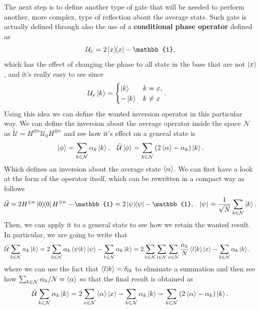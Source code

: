 \noindent
The next step is to define another type of gate that will be needed to perform another, more complex, type of reflection about the average state. Such gate is actually defined through also the use of a \textbf{conditional phase operator} defined as
\begin{equation}
    \mathcal{U}_x = 2\ketbra{x} - \mathbb{1},
\end{equation}
which has the effect of changing the phase to all state in the base that are not $\ket{x}$, and it's really easy to see since
\begin{align}
    &\mathcal{U}_x\ket{k} = \begin{cases}
        \ket{k} & k = x,\\
        -\ket{k} & k \neq x
    \end{cases}.
\end{align}
Using this idea we can define the wanted inversion operator in this particular way.
{
    We can define the inversion about the average operator inside the space $\mathcal{N}$ as $\tilde{\mathcal{U}} = H^{\otimes n}\mathcal{U}_0 H^{\otimes n}$ and see how it's effect on a general state is
    \begin{align}
        &\ket{\phi} = \sum_{k\in\mathcal{N}}\alpha_k\ket{k}, &\tilde{\mathcal{U}}\ket{\phi} = \sum_{k\in\mathcal{N}}\left( 2\left\langle \alpha \right\rangle - \alpha_k \right) \ket{k}.
    \end{align}
    Which defines an inversion about the average state $\left\langle \alpha \right\rangle$.
}
{
    We can first have a look at the form of the operator itself, which can be rewritten in a compact way as follows
    \begin{align}
        &\tilde{\mathcal{U}} = 2H^{\otimes n}\ketbra{0}H^{\otimes n} -\mathbb{1} = 2\ketbra{\psi} - \mathbb{1}, &\ket{\psi} = \frac{1}{\sqrt{N}}\sum_{k\in \mathcal{N}} \ket{k}.
    \end{align}
    Then, we can apply it to a general state to see how we retain the wanted result. In particular, we are going to write that
    \begin{align}
        &\tilde{\mathcal{U}}\sum_{k\in\mathcal{N}}\alpha_k\ket{k} = 2\sum_{k\in\mathcal{N}}\alpha_k\braket{\psi}{k}\ket{\psi} - \sum_{k\in\mathcal{N}}\alpha_k\ket{k} = 2\sum_{k\in\mathcal{N}}\sum_{l\in\mathcal{N}}\sum_{x\in\mathcal{N}}\frac{\alpha_k}{N} \braket{l}{k}\ket{x} - \sum_{k\in\mathcal{N}}\alpha_k\ket{k},
    \end{align}
    where we can use the fact that $\braket{l}{k} = \delta_{lk}$ to eliminate a summation and then see how $\sum_{k\in\mathcal{N}}\alpha_k/N = \left\langle \alpha \right\rangle$ so that the final result is obtained as
    \begin{equation}
        \tilde{\mathcal{U}}\sum_{k\in\mathcal{N}}\alpha_k\ket{k} = 2\sum_{x\in\mathcal{N}}\left\langle \alpha \right\rangle\ket{x} - \sum_{k\in\mathcal{N}}\alpha_k\ket{k} = \sum_{k\in\mathcal{N}}\left( 2\left\langle \alpha \right\rangle - \alpha_k \right) \ket{k}.
    \end{equation}
}

